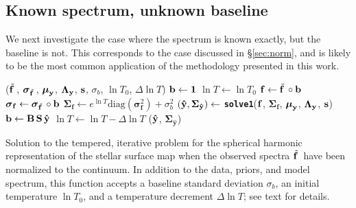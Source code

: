 \documentclass[modern]{aastex631}
\begin{document}
\subsection{Known spectrum, unknown baseline}
\label{sec:spot_y1b}
%
We next investigate the case where the spectrum is known exactly, but the baseline is not. 
This corresponds to the case discussed in
\S\ref{sec:norm}, and is likely to be the most common application of the methodology presented in this work.

\begin{algorithm}
    \begin{spacing}{1.25}
        \begin{fminipage}{0.98\textwidth}
            \vspace{1em}
            \begin{algorithmic}
                ($\tilde{{\mathbf{f}}\hspace{0.2em}}$, $\boldsymbol{\sigma}_{\tilde{{\mathbf{f}}\hspace{0.2em}}}$, $\boldsymbol{\mu}_{\mathbf{y}}$, $\boldsymbol{\Lambda}_{\mathbf{y}}$, ${\mathbf{s}}$, $\sigma_b$, $\ln T_0$, $\Delta \ln T$)
                \STATE ${\mathbf{b}} \gets {\ensuremath{\mathbf{1}}}$
                \STATE $\ln T \gets \ln T_0$
                    \STATE $
                    {\mathbf{f}} 
                    \gets 
                    \tilde{{\mathbf{f}}\hspace{0.2em}} \circ {\ensuremath{\mathbf{b}}}
                    $
                    \STATE $
                    \boldsymbol{\sigma}_\mathbf{f} 
                    \gets 
                    \boldsymbol{\sigma}_{\tilde{{\mathbf{f}}\hspace{0.2em}}} \circ {\ensuremath{\mathbf{b}}}
                    $
                    \STATE $
                    \boldsymbol{\Sigma}_\mathbf{f} 
                    \gets 
                    e^{\ln T} \mathrm{diag}(\boldsymbol{\sigma}_\mathbf{f}^2) + \sigma_b^2
                    $
                    \STATE 
                    $
                    ({\mathbf{\hat{y}}}, \boldsymbol{\Sigma}_{\mathbf{\hat{y}}})
                    \gets
                    $
                    \texttt{\textbf{solve1}}(${\mathbf{f}}$, $\boldsymbol{\Sigma}_\mathbf{f}$, $\boldsymbol{\mu}_{\mathbf{y}}$, $\boldsymbol{\Lambda}_{\mathbf{y}}$, ${\mathbf{s}}$)
                    \STATE ${\mathbf{b}} \gets {\ensuremath{\mathbf{B}}} \, {\mathbf{S}} \, {\mathbf{\hat{y}}} $
                    \STATE $\ln T \gets \ln T - \Delta \ln T$
                \ENDWHILE
                \RETURN (${\mathbf{\hat{y}}}$, $\boldsymbol{\Sigma}_\mathbf{\hat{y}}$)
                \ENDFUNCTION
            \end{algorithmic}
            \vspace{1em}
        \end{fminipage}
    \end{spacing}
    \caption{Solution to the tempered, iterative problem for the spherical harmonic representation of the stellar surface map when the observed spectra $\tilde{{\mathbf{f}}\hspace{0.2em}}$ have been normalized to the continuum. In addition to the data, priors, and model spectrum, this function accepts a baseline standard deviation $\sigma_b$, an initial temperature $\ln T_0$, and a temperature decrement $\Delta \ln T$; see text for details.
    \label{alg:solve2}}
\end{algorithm}
\end{document}
